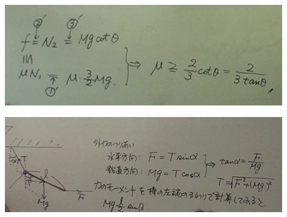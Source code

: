 \documentclass{jsarticle}
\begin{document}
	\begin{center}
		\includegraphics[width=12cm]{5_13_5.JPG}
	\end{center}
	\begin{center}
		\includegraphics[width=12cm]{5_13_6.JPG}
	\end{center}
	
\end{document}

